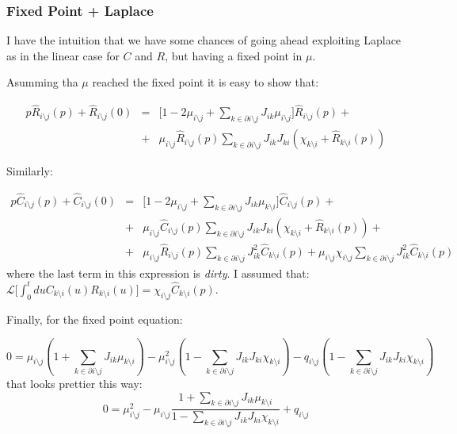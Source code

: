 \documentclass[
    preprint,
    linenumbers,
    amsmath,amssymb,amsfonts,
    aps, physrev,
    superscriptaddress,
    10pt,
    bibnotes
    ]{revtex4-2}
\begin{document}
\subsubsection{Fixed Point + Laplace}

I have the intuition that we have some chances of going ahead exploiting Laplace as in the linear case for $C$ and $R$, but having a fixed point in $\mu$.

Asumming tha $\mu$ reached the fixed point it is easy to show that:

\begin{eqnarray}
  p \hat{R}_{i\setminus j}(p) + \hat{R}_{i\setminus j}(0) &=& \Big[ 1- 2 \mu_{i\setminus j } + \sum_{k\in \partial i \setminus j} J_{ik} \mu_{i\setminus j } \Big] \hat{R}_{i\setminus j}(p) +\nonumber \\
  &+& \mu_{i\setminus j } \hat{R}_{i\setminus j}(p) \sum_{k\in \partial i \setminus j} J_{ik}J_{ki} (\chi_{k\setminus i}  + \hat{R}_{k \setminus i}(p))
\end{eqnarray}

Similarly:

\begin{eqnarray}
  p \hat{C}_{i\setminus j}(p) + \hat{C}_{i\setminus j}(0) &=& \Big[ 1- 2 \mu_{i\setminus j } + \sum_{k\in \partial i \setminus j} J_{ik} \mu_{k\setminus i } \Big] \hat{C}_{i\setminus j}(p) +  \nonumber \\
  &+& \mu_{i\setminus j } \hat{C}_{i\setminus j}(p) \sum_{k\in \partial i \setminus j} J_{ik}J_{ki} (\chi_{k\setminus i}  + \hat{R}_{k \setminus i}(p)) +  \nonumber \\
 & + &\mu_{i\setminus j } \hat{R}_{i\setminus j}(p) \sum_{k\in \partial i \setminus j} J_{ik}^2 \hat{C}_{k\setminus i}(p) + \mu_{i\setminus j } \chi_{i\setminus j} \sum_{k\in \partial i \setminus j} J_{ik}^2 \hat{C}_{k\setminus i}(p)
\end{eqnarray}
where the last term in this expression is {\it dirty}. I assumed that: $\mathcal{L} \Big[ \int_0^t du C_{k\setminus i}(u) R_{k\setminus i}(u) \Big] = \chi_{i\setminus j} \hat{C}_{k\setminus i}(p)$.

Finally, for the fixed point equation:

\begin{equation}
  0 = \mu_{i\setminus j} (1 + \sum_{k\in \partial i \setminus j} J_{ik} \mu_{k\setminus i} ) - \mu_{i\setminus j}^2 (1 - \sum_{k\in \partial i \setminus j} J_{ik}J_{ki} \chi_{k\setminus i} ) - q_{i\setminus j}(1- \sum_{k\in \partial i \setminus j} J_{ik}J_{ki} \chi_{k\setminus i})
\end{equation}
that looks prettier this way:
\begin{equation}
  0 = \mu_{i\setminus j}^2 - \mu_{i\setminus j}\frac{1 + \sum_{k\in \partial i \setminus j} J_{ik} \mu_{k\setminus i}}{1 - \sum_{k\in \partial i \setminus j} J_{ik}J_{ki} \chi_{k\setminus i}} +q_{i\setminus j}
\end{equation}
\end{document}

